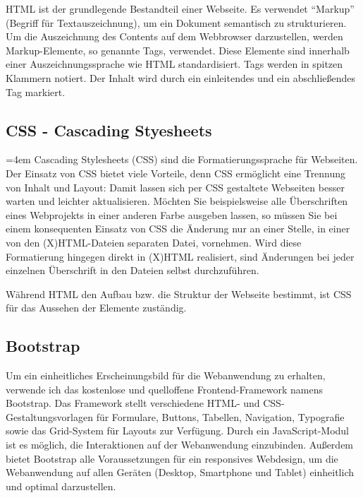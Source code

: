 HTML ist der grundlegende Bestandteil einer Webseite. Es verwendet “Markup” (Begriff für Textauszeichnung), um ein Dokument semantisch zu strukturieren. Um die Auszeichnung des Contents auf dem Webbrowser darzustellen, werden Markup-Elemente, so genannte Tags, verwendet. Diese Elemente sind innerhalb einer Auszeichnungssprache wie HTML standardisiert. Tags werden in spitzen Klammern notiert. Der Inhalt wird durch ein einleitendes und ein abschließendes Tag markiert.

\subsection{CSS - Cascading Styesheets}
\label{subsec:css}
\par
\begingroup
\leftskip=4em %
\rightskip\leftskip
\noindent \glqq Cascading Stylesheets (CSS) sind die Formatierungssprache für Webseiten. Der Einsatz von CSS bietet viele Vorteile, denn CSS ermöglicht eine Trennung von Inhalt und Layout: Damit lassen sich per CSS gestaltete Webseiten besser warten und leichter aktualisieren. Möchten Sie beispielsweise alle Überschriften eines Webprojekts in einer anderen Farbe ausgeben lassen, so müssen Sie bei einem konsequenten Einsatz von CSS die Änderung nur an einer Stelle, in einer von den (X)HTML-Dateien separaten Datei, vornehmen. Wird diese Formatierung hingegen direkt in (X)HTML realisiert, sind Änderungen bei jeder einzelnen Überschrift in den Dateien selbst durchzuführen.\grqq{} \cite{WHM2011}
\par
\endgroup
\bigskip

Während HTML den Aufbau bzw. die Struktur der Webseite bestimmt, ist CSS für das Aussehen der Elemente zuständig.

\subsection{Bootstrap}
\label{subsec:bootstrap}
Um ein einheitliches Erscheinungsbild für die Webanwendung zu erhalten, verwende ich das kostenlose und quelloffene Frontend-Framework namens Bootstrap.
Das Framework stellt verschiedene HTML- und CSS-Gestaltungsvorl\-agen für Formulare, Buttons, Tabellen, Navigation, Typografie sowie das Grid-System für Layouts zur Verfügung. Durch ein JavaScript-Modul ist es möglich, die Interaktionen auf der Webanwendung einzubinden. Außerdem bietet Bootstrap alle Voraussetzungen für ein responsives Webdesign, um die Webanwendung auf allen Geräten (Desktop, Smartphone und Tablet) einheitlich und optimal darzustellen.

